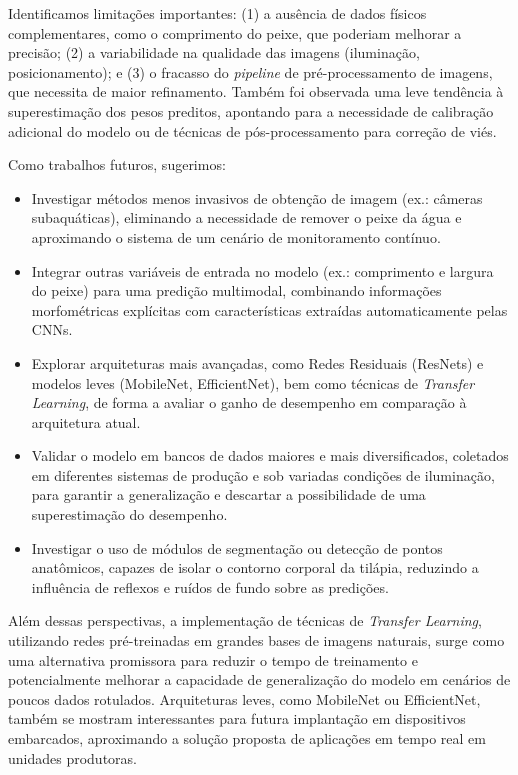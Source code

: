 \documentclass[sigconf,nonacm,screen]{acmart}
\begin{document}
Identificamos limitações importantes: (1) a ausência de dados físicos complementares, como o comprimento do peixe, que poderiam melhorar a precisão; (2) a variabilidade na qualidade das imagens (iluminação, posicionamento); e (3) o fracasso do \textit{pipeline} de pré-processamento de imagens, que necessita de maior refinamento. Também foi observada uma leve tendência à superestimação dos pesos preditos, apontando para a necessidade de calibração adicional do modelo ou de técnicas de pós-processamento para correção de viés.

Como trabalhos futuros, sugerimos:
\begin{itemize}
    \item Investigar métodos menos invasivos de obtenção de imagem (ex.: câmeras subaquáticas), eliminando a necessidade de remover o peixe da água e aproximando o sistema de um cenário de monitoramento contínuo.
    \item Integrar outras variáveis de entrada no modelo (ex.: comprimento e largura do peixe) para uma predição multimodal, combinando informações morfométricas explícitas com características extraídas automaticamente pelas CNNs.
    \item Explorar arquiteturas mais avançadas, como Redes Residuais (ResNets) e modelos leves (MobileNet, EfficientNet), bem como técnicas de \textit{Transfer Learning}, de forma a avaliar o ganho de desempenho em comparação à arquitetura atual.
    \item Validar o modelo em bancos de dados maiores e mais diversificados, coletados em diferentes sistemas de produção e sob variadas condições de iluminação, para garantir a generalização e descartar a possibilidade de uma superestimação do desempenho.
    \item Investigar o uso de módulos de segmentação ou detecção de pontos anatômicos, capazes de isolar o contorno corporal da tilápia, reduzindo a influência de reflexos e ruídos de fundo sobre as predições.
\end{itemize}

Além dessas perspectivas, a implementação de técnicas de \textit{Transfer Learning}, utilizando redes pré-treinadas em grandes bases de imagens naturais, surge como uma alternativa promissora para reduzir o tempo de treinamento e potencialmente melhorar a capacidade de generalização do modelo em cenários de poucos dados rotulados. Arquiteturas leves, como MobileNet ou EfficientNet, também se mostram interessantes para futura implantação em dispositivos embarcados, aproximando a solução proposta de aplicações em tempo real em unidades produtoras.
\end{document}
